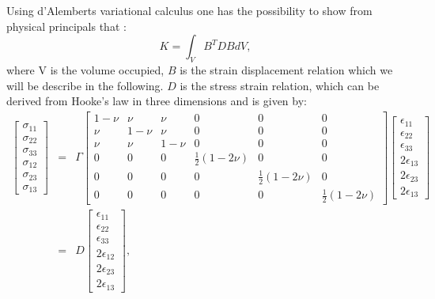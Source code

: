 Using d'Alemberts variational calculus one has the possibility to show from
physical principals that \cite{bathe}:
\begin{equation}
  K = \int_VB^{T}DB dV,
  \label{eqn-stiffness}
\end{equation}
where V is the volume occupied, $B$ is the strain displacement
relation which we will be describe in the following. $D$ is the stress
strain relation, which can be derived from Hooke's law
\cite{mechanics} in three dimensions and is given by: 
\begin{eqnarray}
  \left[\begin{array}{c}
      \sigma_{11} \\ \sigma_{22} \\ \sigma_{33} \\ \sigma_{12} \\
      \sigma_{23} \\ \sigma_{13}
    \end{array}
    \right]
  &=& \Gamma\left[\begin{array}{cccccc}
    1-\nu & \nu & \nu & 0 & 0 & 0 \\
    \nu & 1-\nu & \nu & 0 & 0 & 0 \\
    \nu & \nu & 1-\nu & 0 & 0 & 0 \\
    0 & 0 & 0 & \frac{1}{2}(1-2\nu) & 0 & 0 \\
    0 & 0 & 0 & 0 & \frac{1}{2}(1-2\nu) & 0 \\
    0 & 0 & 0 & 0 & 0 & \frac{1}{2}(1-2\nu)
    \end{array}
    \right] 
  \left[\begin{array}{c}
      \epsilon_{11} \\ \epsilon_{22} \\ \epsilon_{33} \\ 2\epsilon_{13} \\
      2\epsilon_{23} \\ 2\epsilon_{13}
    \end{array}
    \right] \nonumber \\
  &=& D \left[\begin{array}{c}
      \epsilon_{11} \\ \epsilon_{22} \\ \epsilon_{33} \\ 2\epsilon_{12} \\
      2\epsilon_{23} \\ 2\epsilon_{13}
    \end{array}
    \right],
\end{eqnarray}
